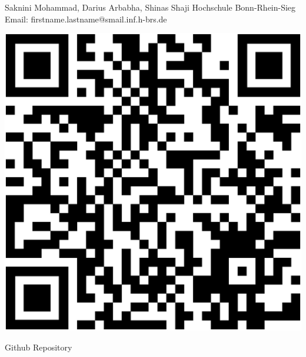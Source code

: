 

{
	\vspace*{1cm}
    \begin{minipage}{0.75\linewidth}
        \vspace*{-2.5cm}
        Saknini Mohammad, Darius Arbabha, Shinas Shaji\newline
        Hochschule Bonn-Rhein-Sieg\newline
        Email: firstname.lastname@smail.inf.h-brs.de\newline
    \end{minipage}
    \begin{minipage}{0.24\linewidth}
        \centering
        \vspace{-1.5cm}
        \begin{tikzfigure}
            \includegraphics[scale=0.125]{figures/qrcode.eps}
        \end{tikzfigure}
        Github Repository
    \end{minipage}
    
}

